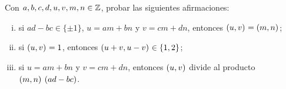 
\begin{ejerDivisibilidad}
	Con $a,b,c,d,u,v,m,n\in\mathbb{Z}$, probar las siguientes
	afirmaciones:
	\begin{enumerate}[(i)]
		\item si $ad-bc\in\{\pm 1\}$, $u=am+bn$ y $v=cm+dn$,
			entonces $\left({u,v}\right)_{}=\left({m,n}\right)_{}$;
		\item si $\left({u,v}\right)_{}=1$, entonces $\left({u+v,u-v}\right)_{}\in\{1,2\}$;
		\item si $u=am+bn$ y $v=cm+dn$, entonces
			$\left({u,v}\right)_{}$ divide al producto
			$\left({m,n}\right)_{}\,(ad-bc)$.
	\end{enumerate}
\end{ejerDivisibilidad}

